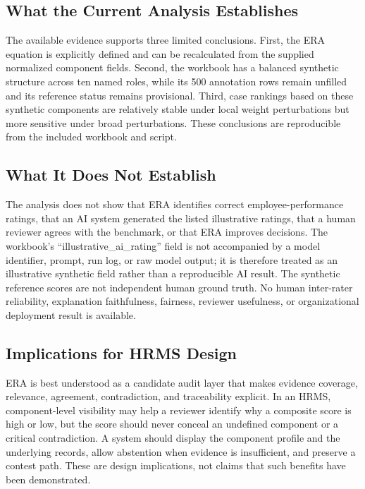 \documentclass[
  10pt,
  a4paper,
  runningheads]{llncs}
\begin{document}
\subsection{What the Current Analysis
Establishes}\label{what-the-current-analysis-establishes}

The available evidence supports three limited conclusions. First, the
ERA equation is explicitly defined and can be recalculated from the
supplied normalized component fields. Second, the workbook has a
balanced synthetic structure across ten named roles, while its 500
annotation rows remain unfilled and its reference status remains
provisional. Third, case rankings based on these synthetic components
are relatively stable under local weight perturbations but more
sensitive under broad perturbations. These conclusions are reproducible
from the included workbook and script.

\subsection{What It Does Not
Establish}\label{what-it-does-not-establish}

The analysis does not show that ERA identifies correct
employee-performance ratings, that an AI system generated the listed
illustrative ratings, that a human reviewer agrees with the benchmark,
or that ERA improves decisions. The workbook's
``illustrative\_ai\_rating'' field is not accompanied by a model
identifier, prompt, run log, or raw model output; it is therefore
treated as an illustrative synthetic field rather than a reproducible AI
result. The synthetic reference scores are not independent human ground
truth. No human inter-rater reliability, explanation faithfulness,
fairness, reviewer usefulness, or organizational deployment result is
available.

\subsection{Implications for HRMS
Design}\label{implications-for-hrms-design}

ERA is best understood as a candidate audit layer that makes evidence
coverage, relevance, agreement, contradiction, and traceability
explicit. In an HRMS, component-level visibility may help a reviewer
identify why a composite score is high or low, but the score should
never conceal an undefined component or a critical contradiction. A
system should display the component profile and the underlying records,
allow abstention when evidence is insufficient, and preserve a contest
path. These are design implications, not claims that such benefits have
been demonstrated.
\end{document}
